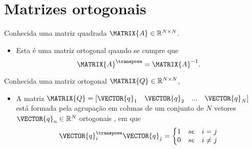 \section{ Matrizes ortogonais}


\begin{definition}\label{def:ortogonalmatrix0}
Conhecida uma matriz quadrada $\MATRIX{A} \in \mathbb{R}^{N \times N}$. 
\begin{itemize}
\item Esta é uma matriz ortogonal quando se cumpre que \cite[pp. 66]{golub2013matrix}
\begin{equation}
\MATRIX{A}^{\transpose} = \MATRIX{A}^{-1}.
\end{equation}
\end{itemize}
\end{definition}

\begin{theorem}\label{theo:ortogonalmatrix0}
Conhecida uma matriz ortogonal $\MATRIX{Q} \in \mathbb{R}^{N \times N}$,
\begin{itemize}
\item A matriz $\MATRIX{Q}=\left[\VECTOR{q}_1\quad \VECTOR{q}_2\quad ... \quad \VECTOR{q}_N \right]$
está formada pela agrupação em colunas de um conjunto de $N$ vetores $\VECTOR{q}_n \in \mathbb{R}^{N}$
ortogonais \cite[pp. 66]{golub2013matrix}, em que 
\begin{equation}
\VECTOR{q}_i^{\transpose}\VECTOR{q}_j=
\left\{ 
\begin{matrix}
1 & se & i = j\\
0 & se & i \neq j
\end{matrix}
\right.
\end{equation} 
\end{itemize}
\end{theorem}

